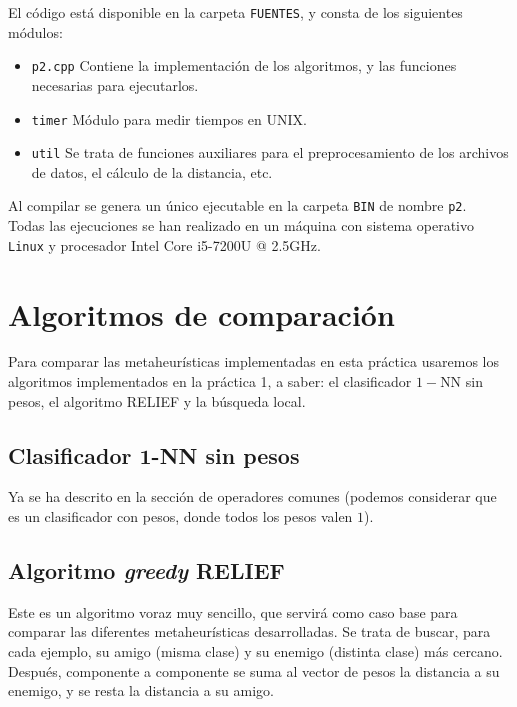 \documentclass[12pt]{article}
\begin{document}
El código está disponible en la carpeta \verb|FUENTES|, y consta de los siguientes módulos:

\begin{itemize}
	\item \verb|p2.cpp| Contiene la implementación de los algoritmos, y las funciones necesarias para ejecutarlos.
	\item \verb|timer| Módulo para medir tiempos en UNIX.
	\item \verb|util| Se trata de funciones auxiliares para el preprocesamiento de los archivos de datos, el cálculo de la distancia, etc.
\end{itemize}

Al compilar se genera un único ejecutable en la carpeta \verb|BIN| de nombre \verb|p2|.\\

Todas las ejecuciones se han realizado en un máquina con sistema operativo \verb|Linux| y procesador Intel Core i5-7200U @ 2.5GHz.

\newpage
\section{Algoritmos de comparación}

Para comparar las metaheurísticas implementadas en esta práctica usaremos los algoritmos implementados en la práctica 1, a saber: el clasificador $1-$NN sin pesos, el algoritmo RELIEF y la búsqueda local.

\subsection*{{\color{red} Clasificador $\mathbf{1}$-NN sin pesos}}

Ya se ha descrito en la sección de operadores comunes (podemos considerar que es un clasificador con pesos, donde todos los pesos valen $1$).

\subsection*{{\color{red} Algoritmo \textit{greedy} RELIEF}}

Este es un algoritmo voraz muy sencillo, que servirá como caso base para comparar las diferentes metaheurísticas desarrolladas. Se trata de buscar, para cada ejemplo, su amigo (misma clase) y su enemigo (distinta clase) más cercano. Después, componente a componente se suma al vector de pesos la distancia a su enemigo, y se resta la distancia a su amigo.\\
\end{document}
